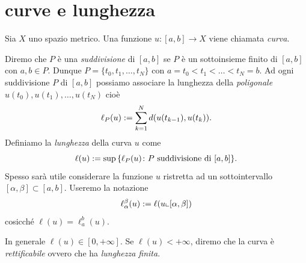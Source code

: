 \section{curve e lunghezza}

Sia $X$ uno spazio metrico. Una funzione $u\colon [a,b] \to X$
viene chiamata \emph{curva}.

\begin{definition}
Diremo che $P$ è una \emph{suddivisione} di $[a,b]$ se
$P$ è un sottoinsieme finito di $[a,b]$ con $a,b\in P$.
Dunque $P = \{ t_0, t_1, \dots, t_N\}$ con $a= t_0 < t_1 < \dots < t_N = b$.
Ad ogni suddivisione $P$ di $[a,b]$ possiamo associare la
lunghezza della \emph{poligonale} $u(t_0), u(t_1), \dots, u(t_N)$ cioè
\[
  \ell_P(u) := \sum_{k=1}^N d(u(t_{k-1}), u(t_k)).
\]
Definiamo la
\emph{lunghezza} della curva $u$ come
\[
    \ell(u) := \sup {\left\{  \ell_P(u) \colon P \text{ suddivisione di } [a,b]  \right\}}.
\]
Spesso sarà utile considerare la funzione $u$ ristretta ad un sottointervallo $[\alpha,\beta]\subset [a,b]$.
Useremo la notazione
\[
  \ell_\alpha^\beta(u) := \ell(u \llcorner [\alpha,\beta])
\] 
cosicché $\ell(u) = \ell_a^b(u)$.

In generale $\ell(u)\in [0, +\infty]$.
Se $\ell(u) < +\infty$, diremo che la curva è \emph{rettificabile}
ovvero che ha \emph{lunghezza finita}.
\end{definition}

